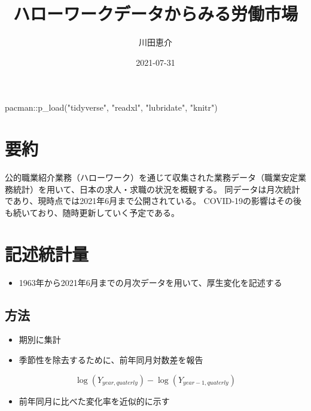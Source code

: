 \documentclass[
]{book}
\title{ハローワークデータからみる労働市場}
\author{川田恵介}
\date{2021-07-31}
\newenvironment{Shaded}{\begin{snugshade}}{\end{snugshade}}
\newcommand{\FunctionTok}[1]{\textcolor[rgb]{0.00,0.00,0.00}{#1}}
\newcommand{\NormalTok}[1]{#1}
\newcommand{\SpecialCharTok}[1]{\textcolor[rgb]{0.00,0.00,0.00}{#1}}
\newcommand{\StringTok}[1]{\textcolor[rgb]{0.31,0.60,0.02}{#1}}
\providecommand{\tightlist}{%
  \setlength{\itemsep}{0pt}\setlength{\parskip}{0pt}}
\begin{document}
\maketitle

{
\setcounter{tocdepth}{1}
\tableofcontents
}
\begin{Shaded}
\begin{Highlighting}[]
\NormalTok{pacman}\SpecialCharTok{::}\FunctionTok{p\_load}\NormalTok{(}\StringTok{"tidyverse"}\NormalTok{,}
               \StringTok{"readxl"}\NormalTok{,}
               \StringTok{"lubridate"}\NormalTok{,}
               \StringTok{"knitr"}\NormalTok{)}
\end{Highlighting}
\end{Shaded}

\hypertarget{ux8981ux7d04}{%
\chapter{要約}\label{ux8981ux7d04}}

公的職業紹介業務（ハローワーク）を通じて収集された業務データ（職業安定業務統計）を用いて、日本の求人・求職の状況を概観する。
同データは月次統計であり、現時点では2021年6月まで公開されている。
COVID-19の影響はその後も続いており、随時更新していく予定である。

\hypertarget{ux8a18ux8ff0ux7d71ux8a08ux91cf}{%
\chapter{記述統計量}\label{ux8a18ux8ff0ux7d71ux8a08ux91cf}}

\begin{itemize}
\tightlist
\item
  1963年から2021年6月までの月次データを用いて、厚生変化を記述する
\end{itemize}

\hypertarget{ux65b9ux6cd5}{%
\section{方法}\label{ux65b9ux6cd5}}

\begin{itemize}
\item
  期別に集計
\item
  季節性を除去するために、前年同月対数差を報告
\end{itemize}

\[\log(Y_{year,quaterly})-\log(Y_{year-1,quaterly})\]

\begin{itemize}
\tightlist
\item
  前年同月に比べた変化率を近似的に示す
\end{itemize}
\end{document}
